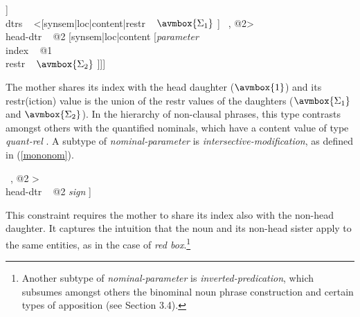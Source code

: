 \documentclass[output=paper]{langsci/langscibook}
\begin{document}
\begin{exe}
\ex\label{param} 
\begin{avm}
[{\it nominal-parameter\/}                                             \\
 synsem|loc [cat|head ~ {\it noun\/}                                   \\
             content [{\it parameter\/}                                \\
                      index ~ @1 {\it index\/}                         \\
                      restr ~ $\avmbox{\Sigma_{1}}$ ~ $\bigcup$ ~ $\avmbox{\Sigma_{2}}$]] \\
 dtrs ~ <[synsem|loc|content|restr ~ $\avmbox{\Sigma_{1}}$ ] ~, @2>     \\
 head-dtr ~ @2 [synsem|loc|content [{\it parameter\/}                  \\
                                    index ~ @1                         \\
                                    restr ~ $\avmbox{\Sigma_{2}}$ ]]]
\end{avm}
\end{exe}

\noindent
The mother shares its index with the head daughter ($\avmbox{1}$) and 
its {\sc restr(iction)} value is the union of the {\sc restr} values 
of the daughters ($\avmbox{\Sigma_{1}}$ and $\avmbox{\Sigma_{2}}$). 
In the hierarchy of non-clausal phrases, this type contrasts amongst others with 
the quantified nominals, which have a {\sc content} value of type 
{\it quant-rel\/} \citep[203--205]{GS00}. A subtype of {\it nominal-parameter\/} is  
{\it intersective-modification}, as defined in (\ref{mononom}).  

\begin{exe}
\ex\label{mononom} 
\begin{avm}
[{\it intersective-modification\/}                \\
 synsem|loc|content|index ~ @1 {\it index\/}      \\
 dtrs ~ <[synsem|loc|content|index ~ @1 ] ~, @2 > \\
 head-dtr ~ @2 {\it sign\/} ]
\end{avm}
\end{exe}

\noindent 
This constraint requires the mother to share its index also with the 
non-head daughter. It captures the intuition that the 
noun and its non-head sister apply to the same entities, as in 
the case of {\it red box}.\footnote{Another subtype of {\it nominal-parameter\/} 
is {\it inverted-predication}, which subsumes amongst others 
the binominal noun phrase construction and certain types of apposition
(see Section 3.4).}  
\end{document}

